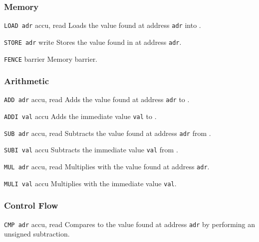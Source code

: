
\subsubsection{Memory}

{\lstinline[language={[concubine]Assembler}]{LOAD adr}}
{accu, read}
{Loads the value found at address \texttt{adr} into \ACCU.}

{\lstinline[language={[concubine]Assembler}]{STORE adr}}
{write}
{Stores the value found in \ACCU{} at address \texttt{adr}.}

{\lstinline[language={[concubine]Assembler}]{FENCE}}
{barrier}
{Memory barrier.}

\subsubsection{Arithmetic}

{\lstinline[language={[concubine]Assembler}]{ADD adr}}
{accu, read}
{Adds the value found at address \texttt{adr} to \ACCU.}

{\lstinline[language={[concubine]Assembler}]{ADDI val}}
{accu}
{Adds the immediate value \texttt{val} to \ACCU.}

{\lstinline[language={[concubine]Assembler}]{SUB adr}}
{accu, read}
{Subtracts the value found at address \texttt{adr} from \ACCU.}

{\lstinline[language={[concubine]Assembler}]{SUBI val}}
{accu}
{Subtracts the immediate value \texttt{val} from \ACCU.}

{\lstinline[language={[concubine]Assembler}]{MUL adr}}
{accu, read}
{Multiplies \ACCU{} with the value found at address \texttt{adr}.}

{\lstinline[language={[concubine]Assembler}]{MULI val}}
{accu}
{Multiplies \ACCU{} with the immediate value \texttt{val}.}

\subsubsection{Control Flow}

{\lstinline[language={[concubine]Assembler}]{CMP adr}}
{accu, read}
{Compares \ACCU{} to the value found at address \texttt{adr} by performing an unsigned subtraction.}

